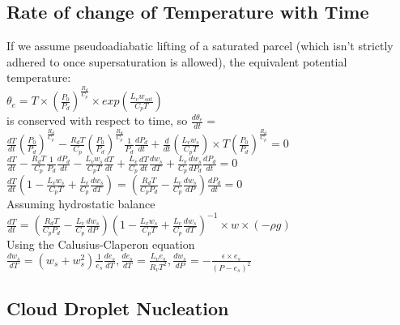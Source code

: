 \documentclass[11pt]{article} %
\begin{document}
\subsection{Rate of change of Temperature with Time} 

If we assume pseudoadiabatic lifting of a saturated parcel (which isn't strictly adhered to once supersaturation is allowed), the equivalent potential temperature:\\

$\theta_{e} = T \times (\frac{P_{0}}{P_{d}})^{\frac{R_{d}}{C_{p}}}\times exp(\frac{L_{v}w_{sat}}{C_{p}T})$\\

is conserved with respect to time, so $\frac{d \theta_{e}}{dt} = $\\

$\frac{dT}{dt}(\frac{P_{0}}{P_{d}})^{\frac{R_{d}}{C_{p}}}  - \frac{R_{d}T}{C_{p}}(\frac{P_{0}}{P_{d}})^{\frac{R_{d}}{C_{p}}}\frac{1}{P_{d}}\frac{dP_{d}}{dt} + \frac{d}{dt} (\frac{L_{v}w_{s}}{C_{p}T}) \times T(\frac{P_{0}}{P_{d}})^{\frac{R_{d}}{C_{p}}} = 0$\\

$\frac{dT}{dt}  - \frac{R_{d}T}{C_{p}}\frac{1}{P_{d}}\frac{dP_{d}}{dt} - \frac{L_{v}w_{s}}{C_{p}T}\frac{dT}{dt} + \frac{L_{v}}{C_{p}}\frac{dT}{dt}\frac{dw_{s}}{dT}+ \frac{L_{v}}{C_{p}}\frac{dw_{s}}{dP_{d}}\frac{dP_{d}}{dt} = 0$\\

$\frac{dT}{dt}(1 - \frac{L_{v}w_{s}}{C_{p}T} + \frac{L_{v}}{C_{p}}\frac{dw_{s}}{dT}) = (\frac{R_{d}T}{C_{p}P_{d}} - \frac{L_{v}}{C_{p}}\frac{dw_{s}}{dP})\frac{dP_{d}}{dt} = 0$\\

Assuming hydrostatic balance\\

$\frac{dT}{dt} = (\frac{R_{d}T}{C_{p}P_{d}} - \frac{L_{v}}{C_{p}}\frac{dw_{s}}{dP})(1 - \frac{L_{v}w_{s}}{C_{p}T} + \frac{L_{v}}{C_{p}}\frac{dw_{s}}{dT})^{-1} \times w \times (-\rho g)$\\

Using the Calusius-Claperon equation\\

$\frac{dw_{s}}{dT} = (w_{s} + w_{s}^{2})\frac{1}{e_{s}}\frac{de_{s}}{dT}, \frac{de_{s}}{dT} = \frac{L_{v} e_{s}}{R_{v}T^{2}}, \frac{dw_{s}}{dP} = -\frac{\epsilon \times e_{s}}{(P - e_{s})^{2}}$ \\

\subsection{Cloud Droplet Nucleation}
\end{document}
